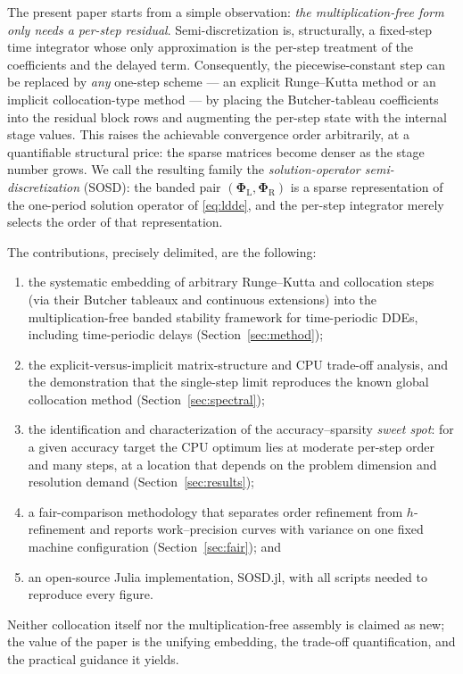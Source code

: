 \documentclass[Afour,sageh,times]{sagej}
\begin{document}
The present paper starts from a simple observation: \emph{the
multiplication-free form only needs a per-step residual}. Semi-discretization
is, structurally, a fixed-step time integrator whose only approximation is the
per-step treatment of the coefficients and the delayed term. Consequently, the
piecewise-constant step can be replaced by \emph{any} one-step scheme --- an
explicit Runge--Kutta method or an implicit collocation-type method --- by
placing the Butcher-tableau coefficients into the residual block rows and
augmenting the per-step state with the internal stage values. This raises the
achievable convergence order arbitrarily, at a quantifiable structural price:
the sparse matrices become denser as the stage number grows. We call the
resulting family the \emph{solution-operator semi-discretization} (SOSD): the
banded pair $(\mathbf{\Phi}_\mathrm{L}, \mathbf{\Phi}_\mathrm{R})$ is a
sparse representation of the one-period solution operator of \eqref{eq:ldde},
and the per-step integrator merely selects the order of that representation.

The contributions, precisely delimited, are the following:
\begin{enumerate}
  \item the systematic embedding of arbitrary Runge--Kutta and collocation
        steps (via their Butcher tableaux and continuous extensions) into the
        multiplication-free banded stability framework for time-periodic
        DDEs, including time-periodic delays (Section~\ref{sec:method});
  \item the explicit-versus-implicit matrix-structure and CPU trade-off
        analysis, and the demonstration that the single-step limit reproduces
        the known global collocation method (Section~\ref{sec:spectral});
  \item the identification and characterization of the accuracy--sparsity
        \emph{sweet spot}: for a given accuracy target the CPU optimum lies
        at moderate per-step order and many steps, at a location that depends
        on the problem dimension and resolution demand
        (Section~\ref{sec:results});
  \item a fair-comparison methodology that separates order refinement from
        $h$-refinement
        and reports work--precision curves with variance on one fixed
        machine configuration (Section~\ref{sec:fair}); and
  \item an open-source Julia implementation, \textsf{SOSD.jl}, with all
        scripts needed to reproduce every figure.
\end{enumerate}
Neither collocation itself \citep{Breda2005} nor the multiplication-free
assembly \citep{Bachrathy2026} is claimed as new; the value of the paper is
the unifying embedding, the trade-off quantification, and the practical
guidance it yields.
\end{document}
